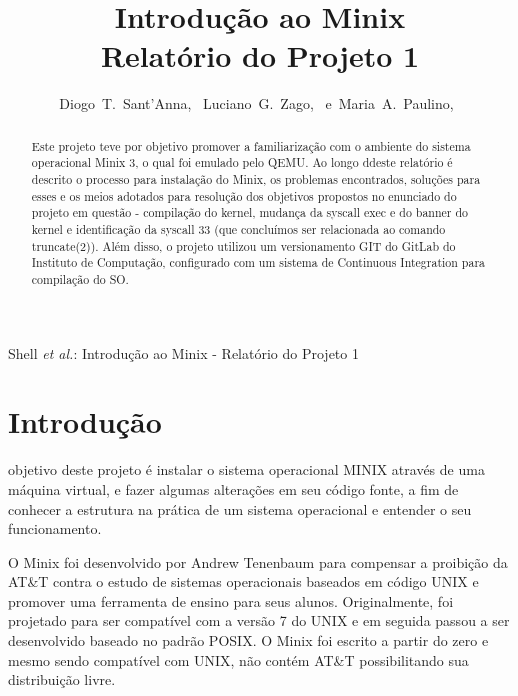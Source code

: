 \documentclass[12pt,journal,compsoc]{IEEEtran}
\begin{document}
\title{Introdução ao Minix \\ Relatório do Projeto 1}
\author{Diogo~T.~Sant'Anna,~
        Luciano~G.~Zago,~
        e~Maria~A.~Paulino,~%
}

%
{Shell \MakeLowercase{\textit{et al.}}: Introdu\c{c}\~ao ao Minix - Relat\'orio do Projeto 1}

\maketitle

\begin{abstract}
Este projeto teve por objetivo promover a familiarização com o ambiente do sistema operacional Minix 3, o qual foi emulado pelo QEMU. Ao longo ddeste relatório é descrito o processo para instalação do Minix, os problemas encontrados, soluções para esses e os meios adotados para resolução dos objetivos propostos no enunciado do projeto em questão - compilação do kernel, mudança da syscall exec e do banner do kernel e identificação da syscall 33 (que concluímos ser relacionada ao comando truncate(2)). Além disso, o projeto utilizou um versionamento GIT do GitLab do Instituto de Computação, configurado com um sistema de Continuous Integration para compilação do SO.
\end{abstract}

\IEEEdisplaynotcompsoctitleabstractindextext

\IEEEpeerreviewmaketitle

\section{Introdução}
 objetivo deste projeto é instalar o sistema operacional MINIX através de uma máquina virtual, e fazer algumas alterações em seu código fonte, a fim de conhecer a estrutura na prática de um sistema operacional e entender o seu funcionamento.

O Minix foi desenvolvido por Andrew Tenenbaum para compensar a proibição da AT\&T contra o estudo de sistemas operacionais baseados em código UNIX e promover uma ferramenta de ensino para seus alunos. Originalmente, foi projetado para ser compatível com a versão 7 do UNIX e em seguida passou a ser desenvolvido baseado no padrão POSIX. O Minix foi escrito a partir do zero e mesmo sendo compatível com UNIX, não contém AT\&T possibilitando sua distribuição livre.
\end{document}
